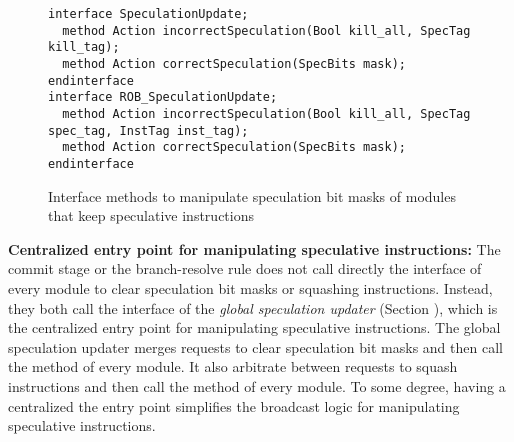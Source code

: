 \begin{figure}
\begin{lstlisting}[caption={}]
interface SpeculationUpdate;
  method Action incorrectSpeculation(Bool kill_all, SpecTag kill_tag);
  method Action correctSpeculation(SpecBits mask);
endinterface
interface ROB_SpeculationUpdate;
  method Action incorrectSpeculation(Bool kill_all, SpecTag spec_tag, InstTag inst_tag);
  method Action correctSpeculation(SpecBits mask);
endinterface
\end{lstlisting}
\caption{Interface methods to manipulate speculation bit masks of modules that keep speculative instructions}\label{fig:specupdate-ifc}
\end{figure}

\noindent\textbf{Centralized entry point for manipulating speculative instructions:}
The commit stage or the branch-resolve rule does not call directly the  interface of every module to clear speculation bit masks or squashing instructions.
Instead, they both call the interface of the \emph{global speculation updater} (Section ), which is the centralized entry point for manipulating speculative instructions.
The global speculation updater merges requests to clear speculation bit masks and then call the  method of every module.
It also arbitrate between requests to squash instructions and then call the  method of every module.
To some degree, having a centralized the entry point simplifies the broadcast logic for manipulating speculative instructions.


